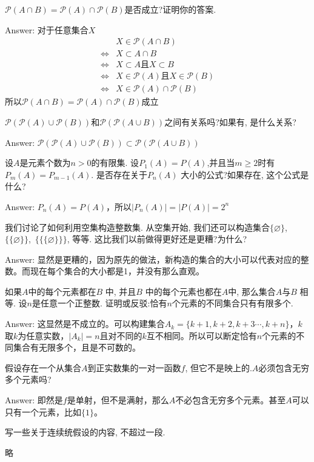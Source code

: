 \exer $\mathcal{P}(A \cap B) =\mathcal{P}(A)\cap\mathcal{P}(B)$是否成立?证明你的答案.\par
Answer: 对于任意集合$X$
\begin{align*}
    & X \in \mathcal{P}(A\cap B) \\
\Longleftrightarrow &  X\subset A\cap B \\
\Longleftrightarrow &  X\subset A\text{且}X\subset B \\
\Longleftrightarrow &  X\in\mathcal{P}(A)\text{且}X\in\mathcal{P}(B) \\
\Longleftrightarrow &  X\in \mathcal{P}(A)\cap\mathcal{P}(B)
\end{align*}
所以$\mathcal{P}(A \cap B) =\mathcal{P}(A)\cap\mathcal{P}(B)$成立

\exer $\mathcal{P}(\mathcal{P}(A)\cup\mathcal{P}(B))$和$\mathcal{P}(\mathcal{P}(A \cup B))$之间有关系吗?如果有, 是什么关系?\par
Answer: $\mathcal{P}(\mathcal{P}(A)\cup\mathcal{P}(B)) \subset\mathcal{P}(\mathcal{P}(A \cup B))$

\exer 设$A$是元素个数为$n > 0$的有限集. 设$P_1(A) = P(A)$,并且当$m \ge2$时有$P_m(A) = P_{m-1}(A)$. 是否存在关于$ P_n(A)$ 大小的公式?如果存在, 这个公式是什么?\par
Answer: $P_n(A)=P(A)$，所以$|P_n(A)|=|P(A)|=2^n$

\exer 我们讨论了如何利用空集构造整数集. 从空集开始, 我们还可以构造集合$\{\varnothing\}$,$\{\{\varnothing\}\}$,\ $\{\{\{\varnothing\}\}\}$, 等等. 这比我们以前做得更好还是更糟?为什么?\par
Answer: 显然是更糟的，因为原先的做法，新构造的集合的大小可以代表对应的整数。而现在每个集合的大小都是1，并没有那么直观。

\exer 如果$A$中的每个元素都在$B$ 中, 并且$B$ 中的每个元素也都在$A$中, 那么集合$A$与$B$ 相等. 设$n$是任意一个正整数. 证明或反驳:恰有$n$个元素的不同集合只有有限多个.\par
Answer: 这显然是不成立的。可以构建集合$A_k=\{k+1,k+2,k+3\cdots, k+n\}$，$k$取$k$为任意实数，$|A_k|=n$且对不同的$k$互不相同。所以可以断定恰有$n$个元素的不同集合有无限多个，且是不可数的。

\exer 假设存在一个从集合$A$到正实数集的一对一函数$f$, 但它不是映上的.$A$必须包含无穷多个元素吗?\par
Answer: 即然是$f$是单射，但不是满射，那么$A$不必包含无穷多个元素。甚至$A$可以只有一个元素，比如$\{1\}$。

\exer 写一些关于连续统假设的内容, 不超过一段.\par
略

